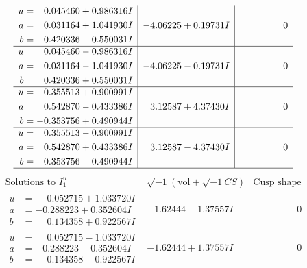 \documentclass[1p]{elsarticle_modified}
\theoremstyle{definition}
\newcommand{\I}{\sqrt{-1}}
\begin{document}
$$\begin{array}{c|c|c}
\begin{aligned}
u &= \phantom{-}0.045460 + 0.986316 I \\
a &= \phantom{-}0.031164 + 1.041930 I \\
b &= \phantom{-}0.420336 - 0.550031 I\end{aligned}
 & -4.06225 + 0.19731 I & \phantom{-0.000000 } 0 \\ \hline\begin{aligned}
u &= \phantom{-}0.045460 - 0.986316 I \\
a &= \phantom{-}0.031164 - 1.041930 I \\
b &= \phantom{-}0.420336 + 0.550031 I\end{aligned}
 & -4.06225 - 0.19731 I & \phantom{-0.000000 } 0 \\ \hline\begin{aligned}
u &= \phantom{-}0.355513 + 0.900991 I \\
a &= \phantom{-}0.542870 - 0.433386 I \\
b &= -0.353756 + 0.490944 I\end{aligned}
 & \phantom{-}3.12587 + 4.37430 I & \phantom{-0.000000 } 0 \\ \hline\begin{aligned}
u &= \phantom{-}0.355513 - 0.900991 I \\
a &= \phantom{-}0.542870 + 0.433386 I \\
b &= -0.353756 - 0.490944 I\end{aligned}
 & \phantom{-}3.12587 - 4.37430 I & \phantom{-0.000000 } 0\\
 \hline 
 \end{array}$$\newpage$$\begin{array}{c|c|c}  
\text{Solutions to }I^u_{1}& \I (\text{vol} + \sqrt{-1}CS) & \text{Cusp shape}\\
 \hline 
\begin{aligned}
u &= \phantom{-}0.052715 + 1.033720 I \\
a &= -0.288223 + 0.352604 I \\
b &= \phantom{-}0.134358 + 0.922567 I\end{aligned}
 & -1.62444 - 1.37557 I & \phantom{-0.000000 } 0 \\ \hline\begin{aligned}
u &= \phantom{-}0.052715 - 1.033720 I \\
a &= -0.288223 - 0.352604 I \\
b &= \phantom{-}0.134358 - 0.922567 I\end{aligned}
 & -1.62444 + 1.37557 I & \phantom{-0.000000 } 0 \\ \hline\begin{aligned}

\end{aligned}
\end{array}$$
\end{document}
